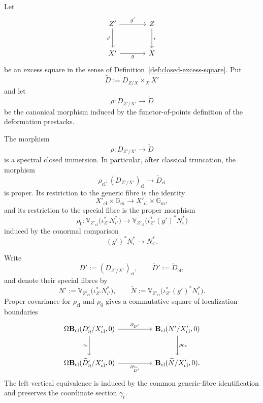 \begin{lemma}
\label{lem:excess-deformation-proper-covariance}
Let
\[
\begin{tikzcd}[column sep=large,row sep=large]
    Z' \arrow[r,"g'"] \arrow[d,"i'"']
        & Z \arrow[d,"i"] \\
    X' \arrow[r,"g"']
        & X
\end{tikzcd}
\]
be an excess square in the sense of
Definition~\ref{def:closed-excess-square}.  Put
\[
    \widetilde D
    :=
    D_{Z/X}\times_XX'
\]
and let
\[
    \rho:
    D_{Z'/X'}
    \longrightarrow
    \widetilde D
\]
be the canonical morphism induced by the functor-of-points definition of
the deformation prestacks.

The morphism
\[
    \rho:
    D_{Z'/X'}
    \longrightarrow
    \widetilde D
\]
is a spectral closed immersion.  In particular, after classical
truncation, the morphism
\[
    \rho_{\mathrm{cl}}:
    (D_{Z'/X'})_{\mathrm{cl}}
    \longrightarrow
    \widetilde D_{\mathrm{cl}}
\]
is proper.  Its restriction to the generic fibre is the identity
\[
    X'_{\mathrm{cl}}\times\mathbb G_m
    \longrightarrow
    X'_{\mathrm{cl}}\times\mathbb G_m,
\]
and its restriction to the special fibre is the proper morphism
\[
    \rho_0:
    \mathbb V_{Z'_{\mathrm{cl}}}
    \bigl(
      \iota_{Z'}^*N_{i'}^*
    \bigr)
    \longrightarrow
    \mathbb V_{Z'_{\mathrm{cl}}}
    \bigl(
      \iota_{Z'}^*(g')^*N_i^*
    \bigr)
\]
induced by the conormal comparison
\[
    (g')^*N_i^*
    \longrightarrow
    N_{i'}^*.
\]

Write
\[
    D'
    :=
    (D_{Z'/X'})_{\mathrm{cl}},
    \qquad
    \widetilde D'
    :=
    \widetilde D_{\mathrm{cl}},
\]
and denote their special fibres by
\[
    N'
    :=
    \mathbb V_{Z'_{\mathrm{cl}}}
    \bigl(
      \iota_{Z'}^*N_{i'}^*
    \bigr),
    \qquad
    \widetilde N
    :=
    \mathbb V_{Z'_{\mathrm{cl}}}
    \bigl(
      \iota_{Z'}^*(g')^*N_i^*
    \bigr).
\]
Proper covariance for \(\rho_{\mathrm{cl}}\) and \(\rho_0\) gives a
commutative square of localization boundaries
\[
\begin{tikzcd}[column sep=huge,row sep=large]
    \Omega
    \mathbf B_{\mathrm{cl}}
    (D'_\eta/X'_{\mathrm{cl}},0)
        \arrow[r,"\partial_{D'}"]
        \arrow[d,"\simeq"']
        &
    \mathbf B_{\mathrm{cl}}
    (N'/X'_{\mathrm{cl}},0)
        \arrow[d,"\rho_{0*}"]
    \\
    \Omega
    \mathbf B_{\mathrm{cl}}
    (\widetilde D'_\eta/X'_{\mathrm{cl}},0)
        \arrow[r,"\partial_{\widetilde D'}"']
        &
    \mathbf B_{\mathrm{cl}}
    (\widetilde N/X'_{\mathrm{cl}},0).
\end{tikzcd}
\]
The left vertical equivalence is induced by the common generic-fibre
identification and preserves the coordinate section \(\gamma_t\).


\end{lemma}

